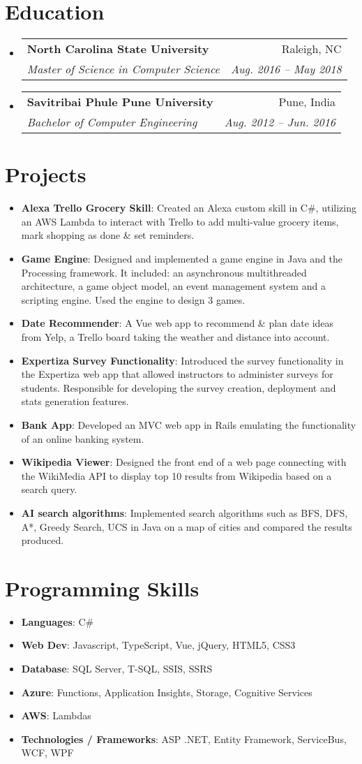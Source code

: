 \documentclass[letterpaper,11pt]{article}
\makeatletter
\newcommand{\resumeItem}[2]{
  \item\small{
    \textbf{#1}{: #2 \vspace{-2pt}}
  }
}
\newcommand{\resumeSubheading}[4]{
  \vspace{-1pt}\item
    \begin{tabular*}{0.97\textwidth}{l@{\extracolsep{\fill}}r}
      \textbf{#1} & #2 \\
      \textit{\small#3} & \textit{\small #4} \\
    \end{tabular*}\vspace{-5pt}
}
\newcommand{\resumeSubItem}[2]{\resumeItem{#1}{#2}\vspace{-4pt}}
\newcommand{\resumeSubHeadingListStart}{\begin{itemize}[leftmargin=*]}
\newcommand{\resumeSubHeadingListEnd}{\end{itemize}}
\makeatother
\begin{document}

\section{Education}
  \resumeSubHeadingListStart
    \resumeSubheading
      {North Carolina State University}{Raleigh, NC}
      {Master of Science in Computer Science}{Aug. 2016 -- May 2018}
    \resumeSubheading
      {Savitribai Phule Pune University}{Pune, India}
      {Bachelor of Computer Engineering}{Aug. 2012 -- Jun. 2016}
  \resumeSubHeadingListEnd
  

\section{Projects}
  \resumeSubHeadingListStart
  	\resumeSubItem{Alexa Trello Grocery Skill}
      {Created an Alexa custom skill in C\#, utilizing an AWS Lambda to interact with Trello to add multi-value grocery items, mark shopping as done \& set reminders.}
    \resumeSubItem{Game Engine}
      {Designed and implemented a game engine in Java and the Processing framework. It included: an asynchronous multithreaded architecture, a game object model, an event management system and a scripting engine. Used the engine to design 3 games.}
      \resumeSubItem{Date Recommender}
      {A Vue web app to recommend \& plan date ideas from Yelp, a Trello board taking the weather and distance into account.}
    \resumeSubItem{Expertiza Survey Functionality}
      {Introduced the survey functionality in the Expertiza web app that allowed instructors to administer surveys for students. Responsible for developing the survey creation, deployment and stats generation features.}
    \resumeSubItem{Bank App}
      {Developed an MVC web app in Rails emulating the functionality of an online banking system.}
    \resumeSubItem{Wikipedia Viewer}
      {Designed the front end of a web page connecting with the WikiMedia API to display top 10 results from Wikipedia based on a search query.}
      \resumeSubItem{AI search algorithms}
      {Implemented search algorithms such as BFS, DFS, A*, Greedy Search, UCS in Java on a map of cities and compared the results produced.}
  \resumeSubHeadingListEnd


\section{Programming Skills}
  \resumeSubHeadingListStart
    \resumeSubItem{Languages}{C\#}
    \resumeSubItem{Web Dev}{Javascript, TypeScript, Vue, jQuery, HTML5, CSS3}
    \resumeSubItem{Database}{SQL Server, T-SQL, SSIS, SSRS}    
    \resumeSubItem{Azure}{Functions, Application Insights, Storage, Cognitive Services}
    \resumeSubItem{AWS}{Lambdas}
    \resumeSubItem{Technologies / Frameworks}{ASP .NET, Entity Framework, ServiceBus, WCF, WPF}
  \resumeSubHeadingListEnd

\end{document}
